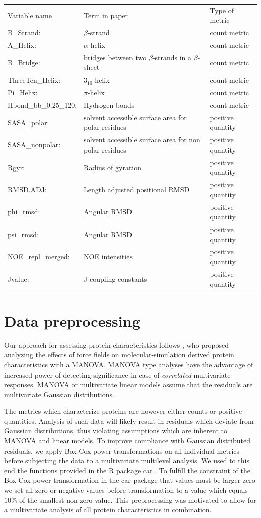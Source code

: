 \documentclass{article}\usepackage[table]{xcolor}
\renewcommand{\$}{$} %
\begin{document}
\begin{center}
\begin{tabular}{l l l}
  Variable name & Term in paper& Type of metric\\
  B\_Strand: &$\beta$-strand& count metric\\
  A\_Helix: &$\alpha$-helix& count metric\\
  B\_Bridge:& bridges between two $\beta$-strands in a $\beta$-sheet& count metric \\
  ThreeTen\_Helix: & $3_{10}$-helix & count metric \\
  Pi\_Helix: & $\pi$-helix & count metric \\
  Hbond\_bb\_0.25\_120: &Hydrogen bonds& count metric\\
  SASA\_polar: & solvent accessible surface area for polar residues & positive quantity\\ 
  SASA\_nonpolar: &solvent accessible surface area for non polar residues & positive quantity\\ 
  Rgyr: &Radius of gyration & positive quantity\\
  RMSD.ADJ: &Length adjusted positional RMSD & positive quantity\\ 
  phi\_rmsd: &Angular RMSD & positive quantity\\ 
  psi\_rmsd: &Angular RMSD & positive quantity\\
  NOE\_repl\_merged: & NOE intensities & positive quantity\\
  Jvalue: &J-coupling constants& positive quantity
\end{tabular}
\end{center}

\section{Data preprocessing}
Our approach for assessing protein characteristics follows
\cite{Villa+etal:2007}, who proposed analyzing the effects of force
fields on molecular-simulation derived protein characteristics with a
MANOVA. MANOVA type analyses have the advantage of increased power of
detecting significance in case of {\em correlated} multivariate
responses. MANOVA or multivariate linear models assume that the
residuals are multivariate Gaussian distributions. 

The metrics which characterize proteins are however either counts or
positive quantities. Analysis of such data will likely result in
residuals which deviate from Gaussian distributions, thus violating
assumptions which are inherent to MANOVA and linear models. To improve
compliance with Gaussian distributed residuals, we apply Box-Cox power
transformations \cite{Box+Cox:1964} on all individual metrics before
subjecting the data to a multivariate multilevel analysis. We used to
this end the functions provided in the R package car
\cite{Fox+Weisberg:2019}. To fulfill the constraint of the Box-Cox
power transformation in the car package that values must be larger
zero we set all zero or negative values before transformation to a
value which equals $10\%$ of the smallest non zero value. This
preprocessing was motivated to allow for a multivariate analysis of
all protein characteristics in combination.
  
\end{document}
